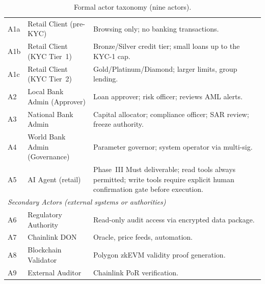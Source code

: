 \documentclass[12pt,a4paper]{report}
\begin{document}
\begin{table}[H]
\centering
\caption[Formal actor taxonomy]{Formal actor taxonomy (nine actors).}
\label{tab:actor-taxonomy}
\begin{tabular}{p{1.2cm}p{4.2cm}p{7.9cm}}
A1a & Retail Client (pre-KYC) & Browsing only; no banking transactions. \\
A1b & Retail Client (KYC Tier~1) & Bronze/Silver credit tier; small loans up to the KYC-1 cap. \\
A1c & Retail Client (KYC Tier~2) & Gold/Platinum/Diamond; larger limits, group lending. \\
A2 & Local Bank Admin (Approver) & Loan approver; risk officer; reviews AML alerts. \\
A3 & National Bank Admin & Capital allocator; compliance officer; SAR review; freeze authority. \\
A4 & World Bank Admin (Governance) & Parameter governor; system operator via multi-sig. \\
A5 & AI Agent (retail) & Phase~III Must deliverable; read tools always permitted; write tools require explicit human confirmation gate before execution. \\
\multicolumn{3}{l}{\textit{Secondary Actors (external systems or authorities)}} \\
A6 & Regulatory Authority & Read-only audit access via encrypted data package. \\
A7 & Chainlink DON & Oracle, price feeds, automation. \\
A8 & Blockchain Validator & Polygon zkEVM validity proof generation. \\
A9 & External Auditor & Chainlink PoR verification. \\
\bottomrule
\end{tabular}
\end{table}
\end{document}
